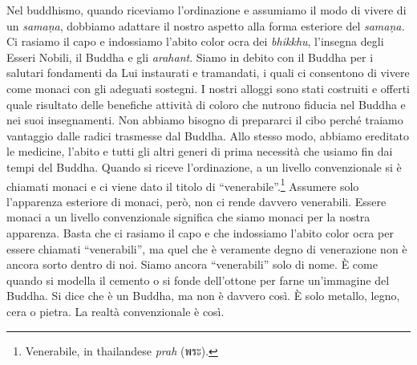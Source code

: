 Nel buddhismo, quando riceviamo l'ordinazione e assumiamo il modo di
vivere di un \emph{samaṇa}, dobbiamo adattare il nostro aspetto alla
forma esteriore del \emph{samaṇa.} Ci rasiamo il capo e indossiamo
l'abito color ocra dei \emph{bhikkhu}, l'insegna degli Esseri Nobili, il
Buddha e gli \emph{arahant}. Siamo in debito con il Buddha per i
salutari fondamenti da Lui instaurati e tramandati, i quali ci
consentono di vivere come monaci con gli adeguati sostegni. I nostri
alloggi sono stati costruiti e offerti quale risultato delle benefiche
attività di coloro che nutrono fiducia nel Buddha e nei suoi
insegnamenti. Non abbiamo bisogno di prepararci il cibo perché traiamo
vantaggio dalle radici trasmesse dal Buddha. Allo stesso modo, abbiamo
ereditato le medicine, l'abito e tutti gli altri generi di prima
necessità che usiamo fin dai tempi del Buddha. Quando si riceve
l'ordinazione, a un livello convenzionale si è chiamati monaci e ci
viene dato il titolo di ``venerabile''.\footnote{Venerabile, in
  thailandese \emph{prah} (พระ).} Assumere solo l'apparenza esteriore di
monaci, però, non ci rende davvero venerabili. Essere monaci a un
livello convenzionale significa che siamo monaci per la nostra
apparenza. Basta che ci rasiamo il capo e che indossiamo l'abito color
ocra per essere chiamati ``venerabili'', ma quel che è veramente degno
di venerazione non è ancora sorto dentro di noi. Siamo ancora
``venerabili'' solo di nome. È come quando si modella il cemento o si
fonde dell'ottone per farne un'immagine del Buddha. Si dice che è un
Buddha, ma non è davvero così. È solo metallo, legno, cera o pietra. La
realtà convenzionale è così.

